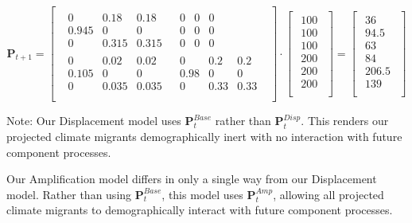 \documentclass[12pt]{article}
\begin{document}
\begin{equation}
\mathbf{P}_{t+1} = 
\begin{bmatrix}
\begin{array}{c|c}

\begin{matrix} 0 & 0.18 & 0.18 \\ 0.945 & 0 & 0 \\ 0 & 0.315 & 0.315 \end{matrix} &
\begin{matrix} 0 & 0 & 0 \\ 0 & 0 & 0 \\ 0 & 0 & 0 \end{matrix} \\
\hline
\begin{matrix} 0 & 0.02 & 0.02 \\ 0.105 & 0 & 0 \\ 0 & 0.035 & 0.035  \end{matrix} &
\begin{matrix} 0 & 0.2 & 0.2 \\ 0.98 & 0 & 0 \\ 0 & 0.33 & 0.33 \end{matrix} \\
\end{array}
\end{bmatrix}
\cdot
\begin{bmatrix}
\begin{array}{c}
100 \\
100 \\
100 \\
\hline
200\\
200\\
200\\
\end{array}
\end{bmatrix}
=
\begin{bmatrix}
\begin{array}{c}
36 \\
94.5\\
63 \\
\hline
84\\
206.5\\
139\\
\end{array}
\end{bmatrix}
\end{equation}

Note: Our Displacement model uses \(\mathbf{P}_t^{Base}\) rather than
\(\mathbf{P}_t^{Disp}\). This renders our projected climate migrants
demographically inert with no interaction with future component
processes.

Our Amplification model differs in only a single way from our
Displacement model. Rather than using \(\mathbf{P}_t^{Base}\), this
model uses \(\mathbf{P}_t^{Amp}\), allowing all projected climate
migrants to demographically interact with future component processes.



\end{document}
